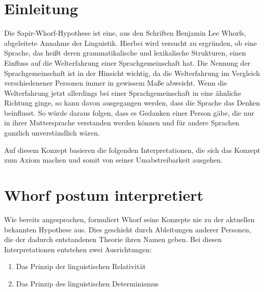 \documentclass[12pt]{scrreprt}
\begin{document}
\section{Einleitung}
\label{sec:sawo_einleitung}
Die Sapir-Whorf-Hypothese ist eine, aus den Schriften Benjamin Lee Whorfs,
abgeleitete Annahme der Linguistik. Hierbei wird versucht zu ergründen, ob eine
Sprache, das heißt deren grammatikalische und lexikalische Strukturen, einen
Einfluss auf die Welterfahrung einer Sprachgemeinschaft hat. Die Nennung der
Sprachgemeinschaft ist in der Hinsicht wichtig, da die Welterfahrung im
Vergleich verschiedenener Personen immer in gewissem Maße abweicht. Wenn die
Welterfahrung jetzt allerdings bei einer Sprachgemeinschaft in eine ähnliche
Richtung ginge, so kann davon ausgegangen werden, dass die Sprache das Denken
beinflusst. So würde daraus folgen, dass es Gedanken einer Person gäbe, die nur
in ihrer Muttersprache verstanden werden können und für andere Sprachen ganzlich
unverständlich wären.

Auf diesem Konzept basieren die folgenden Interpretationen, die sich das Konzept
zum Axiom machen und somit von seiner Umabstreibarkeit ausgehen.
\autocite{wiki:Sapir-Whorf-Hypothese}
	\section{Whorf postum interpretiert}
	\label{sec:sawo_interpret}
	Wie bereits angesprochen, formuliert Whorf seine Konzepte nie zu der aktuellen
	bekannten Hypothese aus. Dies geschieht durch Ableitungen anderer Personen,
	die der dadurch entstandenen Theorie ihren Namen geben. Bei diesen
	Interpretationen entstehen zwei Ausrichtungen:

	\begin{enumerate}
		\item Das Prinzip der linguistischen Relativität
		\item Das Prinzip des linguistischen Determinismus
	\end{enumerate}
\end{document}

